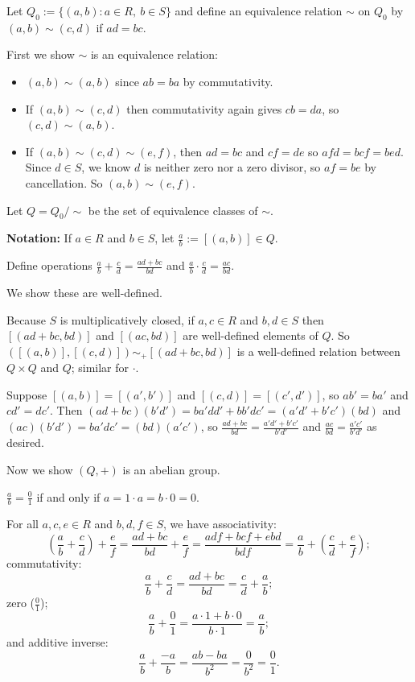 \documentclass[12pt,letterpaper]{report}
\begin{document}
\begin{thmproof}
  Let $Q_0 := \{(a, b) : a \in R, \ b \in S\}$ and define an equivalence relation $\sim$ on $Q_0$ by
  $(a, b) \sim (c, d)$ if $ad = bc$.

  First we show $\sim$ is an equivalence relation:
  \begin{itemize}
    \item $(a, b) \sim (a, b)$ since $ab = ba$ by commutativity.
    \item If $(a, b) \sim (c, d)$ then commutativity again gives $cb = da$, so $(c, d) \sim (a, b)$.
    \item If $(a, b) \sim (c, d) \sim (e, f)$, then $ad = bc$ and $cf = de$ so $afd = bcf = bed$.
    Since $d \in S$, we know $d$ is neither zero nor a zero divisor, so $af = be$ by cancellation.
    So $(a, b) \sim (e, f)$.
  \end{itemize}

  Let $Q = Q_0/\sim$ be the set of equivalence classes of $\sim$.

  \begin{tcolorbox}
    \textbf{Notation:} If $a \in R$ and $b \in S$, let $\frac{a}{b} := [(a, b)] \in Q$.
  \end{tcolorbox}

  Define operations $\frac{a}{b} + \frac{c}{d} = \frac{ad + bc}{bd}$ and
  $\frac{a}{b} \cdot \frac{c}{d} = \frac{ac}{bd}$.

  We show these are well-defined.

  Because $S$ is multiplicatively closed, if $a, c \in R$ and $b, d \in S$ then $[(ad + bc, bd)]$
  and $[(ac, bd)]$ are well-defined elements of $Q$.
  So $([(a, b)], [(c, d)]) \sim_+ [(ad + bc, bd)]$ is a well-defined relation between $Q \times Q$
  and $Q$; similar for $\cdot$.

  Suppose $[(a, b)] = [(a', b')]$ and $[(c, d)] = [(c', d')]$, so $ab' = ba'$ and $cd' = dc'$.
  Then $(ad + bc)(b'd') = ba'dd' + bb'dc' = (a'd' + b'c')(bd)$ and
  $(ac)(b'd') = ba'dc' = (bd)(a'c')$, so $\frac{ad + bc}{bd} = \frac{a'd' + b'c'}{b'd'}$ and
  $\frac{ac}{bd} = \frac{a'c'}{b'd'}$ as desired.

  Now we show $(Q, +)$ is an abelian group.

  \begin{tcolorbox}
    $\frac{a}{b} = \frac{0}{1}$ if and only if $a = 1 \cdot a = b \cdot 0 = 0$.
  \end{tcolorbox}

  For all $a, c, e \in R$ and $b, d, f \in S$, we have associativity:
  \[
    \left(\frac{a}{b} + \frac{c}{d}\right) + \frac{e}{f}
      = \frac{ad + bc}{bd} + \frac{e}{f}
      = \frac{adf + bcf + ebd}{bdf}
      = \frac{a}{b} + \left(\frac{c}{d} + \frac{e}{f}\right);
  \]
  commutativity:
  \[
    \frac{a}{b} + \frac{c}{d} = \frac{ad + bc}{bd} = \frac{c}{d} + \frac{a}{b};
  \]
  zero ($\frac{0}{1}$);
  \[
    \frac{a}{b} + \frac{0}{1} = \frac{a \cdot 1 + b \cdot 0}{b \cdot 1} = \frac{a}{b};
  \]
  and additive inverse:
  \[
    \frac{a}{b} + \frac{-a}{b} = \frac{ab - ba}{b^2} = \frac{0}{b^2} = \frac{0}{1}.
  \]


\end{thmproof}
\end{document}
